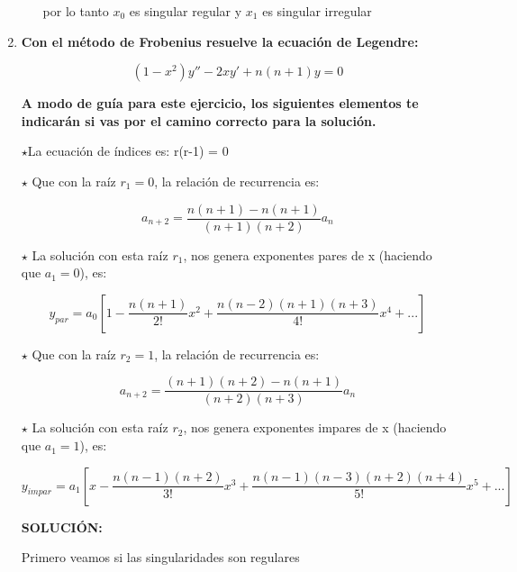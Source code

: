 \documentclass[12pt,a4paper]{article}
\begin{document}
\begin{enumerate}
\begin{enumerate}
        por lo tanto $x_0$ es singular regular y $x_1$ es singular irregular
    \end{enumerate}
    
    
    



    \item \textbf{Con el método de Frobenius resuelve la ecuación de Legendre:}
    
    \begin{equation*}
        (1 - x^2) y'' - 2xy' + n(n+1)y = 0
    \end{equation*}
    
    \textbf{A modo de guía para este ejercicio, los siguientes elementos te indicarán si vas por el camino correcto para la solución.}
    
    $\star$La ecuación de índices es: r(r-1) = 0
    
    $\star$ Que con la raíz $r_1 = 0$, la relación de recurrencia es:
    
    \begin{equation*}
        a_{n+2} = \frac{n(n+1)- n(n+1)}{(n+1)(n+2)} a_n
    \end{equation*}
    
    $\star$ La solución con esta raíz $r_1$, nos genera exponentes pares de x (haciendo que $a_1 = 0$), es:
    
    \begin{equation*}
        y_{par} = a_0 \left[1 - \frac{n(n+1)}{2!}x^2 + \frac{n(n-2)(n+1)(n+3)}{4!} x^4 + ... \right]
    \end{equation*}
    
    $\star$ Que con la raíz $r_2 = 1$, la relación de recurrencia es:
    
    \begin{equation*}
        a_{n+2} = \frac{(n+1)(n+2)-n(n+1)}{(n+2)(n+3)} a_n
    \end{equation*}
    
    $\star$ La solución con esta raíz $r_2$, nos genera exponentes impares de x (haciendo que $a_1 = 1$), es:
    
    \begin{equation*}
        y_{impar}= a_1 \left[x - \frac{n(n-1)(n+2)}{3!} x^3 + \frac{n(n-1)(n-3)(n+2)(n+4)}{5!}x^5 + ... \right]
    \end{equation*}
    
    \textbf{SOLUCIÓN:}
    
    Primero veamos si las singularidades son regulares
    

\end{enumerate}
\end{document}
